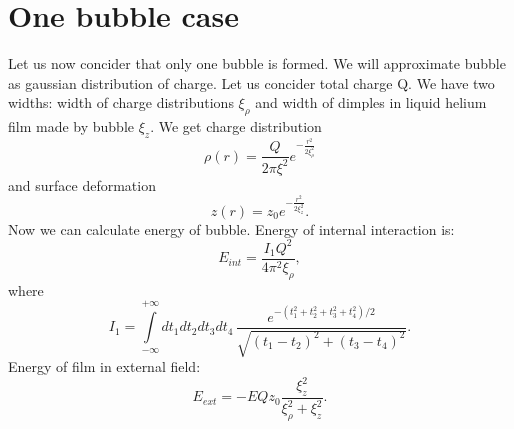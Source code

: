 \documentclass[10pt]{article}
\begin{document}
\section{One bubble case}
Let us now concider that only one bubble is formed.
We will approximate bubble as gaussian distribution of charge.
Let us concider total charge Q.
We have two widths: width of charge distributions $\xi_\rho$ and width of dimples in liquid helium film made by bubble $\xi_z$.
We get charge distribution
\begin{equation}
  \rho(r) = \frac{Q}{2 \pi \xi^2} e^{-\frac{r^2}{2 \xi_\rho^2}}
\end{equation}
and surface deformation
\begin{equation}
  z(r) = z_0 e^{-\frac{r^2}{2 \xi_z^2}}.
\end{equation}
Now we can calculate energy of bubble.
Energy of internal interaction is:
\begin{equation}
  E_{int} = \frac{I_1 Q^2}{4 \pi^2 \xi_\rho},
\end{equation}
where
\begin{equation}
  I_1 = \int\limits_{-\infty}^{+\infty} dt_1 dt_2 dt_3 dt_4 \, \frac{e^{-(t_1^2+t_2^2+t_3^2+t_4^2)/2}}{\sqrt{(t_1-t_2)^2+(t_3-t_4)^2}}.
\end{equation}
Energy of film in external field:
\begin{equation}
  E_{ext} = - E Q z_0 \frac{\xi_z^2}{\xi_\rho^2+\xi_z^2}.
\end{equation}
\end{document}
